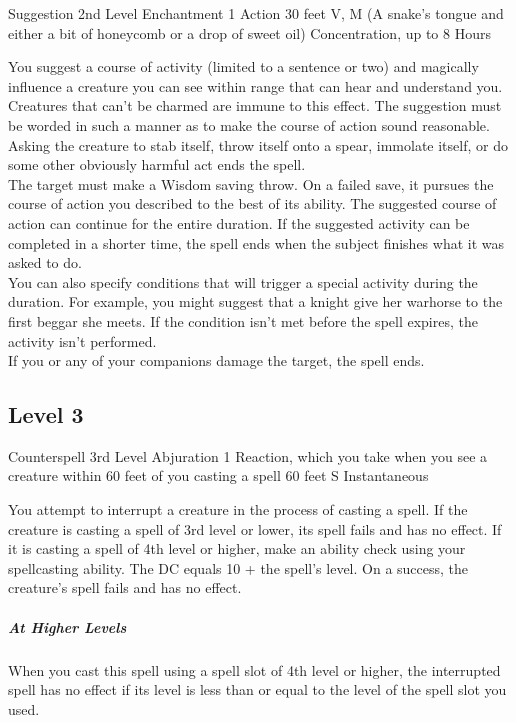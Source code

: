 \documentclass[letterpaper,openany,oneside,twocolumn]{book}
\begin{document}
\DndSpellHeader
  {Suggestion}
  {2nd Level Enchantment}
  {1 Action}
  {30 feet}
  {V, M (A snake's tongue and either a bit of honeycomb or a drop of sweet oil)}
  {Concentration, up to 8 Hours}

You suggest a course of activity (limited to a sentence or two) and magically influence a creature you can see within range that can hear and understand you. Creatures that can't be charmed are immune to this effect. The suggestion must be worded in such a manner as to make the course of action sound reasonable. Asking the creature to stab itself, throw itself onto a spear, immolate itself, or do some other obviously harmful act ends the spell.\\
The target must make a Wisdom saving throw. On a failed save, it pursues the course of action you described to the best of its ability. The suggested course of action can continue for the entire duration. If the suggested activity can be completed in a shorter time, the spell ends when the subject finishes what it was asked to do.\\
You can also specify conditions that will trigger a special activity during the duration. For example, you might suggest that a knight give her warhorse to the first beggar she meets. If the condition isn't met before the spell expires, the activity isn't performed.\\
If you or any of your companions damage the target, the spell ends.

\subsection*{Level 3}

\DndSpellHeader
  {Counterspell}
  {3rd Level Abjuration}
  {1 Reaction, which you take when you see a creature within 60 feet of you casting a spell}
  {60 feet}
  {S}
  {Instantaneous}
  
You attempt to interrupt a creature in the process of casting a spell. If the creature is casting a spell of 3rd level or lower, its spell fails and has no effect. If it is casting a spell of 4th level or higher, make an ability check using your spellcasting ability. The DC equals 10 + the spell’s level. On a success, the creature’s spell fails and has no effect.

\subparagraph*{At Higher Levels} When you cast this spell using a spell slot of 4th level or higher, the interrupted spell has no effect if its level is less than or equal to the level of the spell slot you used.
\end{document}

